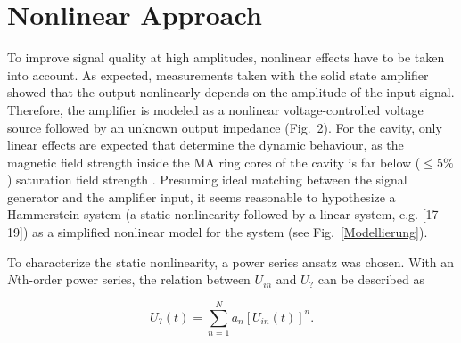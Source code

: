 \documentclass[a4paper,
              ]{jacow}
\begin{document}
	\section{Nonlinear Approach}			
	To improve signal quality at high amplitudes, nonlinear effects have to be taken into account. As expected, measurements taken with the solid state amplifier
	showed that the output nonlinearly depends on the amplitude of the input signal. Therefore, the amplifier is modeled as a nonlinear voltage-controlled
	voltage source followed by an unknown output impedance (Fig.~2). For the cavity, only linear effects
	are expected that determine the dynamic behaviour, as the magnetic field strength inside the MA ring cores of the cavity is far below ($\le 5\%$) 
	saturation field strength \cite{VV_JH}. Presuming ideal matching between the signal generator and the amplifier input, it seems reasonable to hypothesize a Hammerstein
	system (a static nonlinearity followed by a linear system, e.g. [17-19]) as a simplified nonlinear model for the system %
	(see Fig.~\ref{Modellierung}).
	
	To characterize the static nonlinearity, a power series ansatz was chosen. With an $N$th-order power series, the relation between $U_{in}$ and $U_?$
	can be described as
	
	\begin{equation}
	 U_?(t)=\sum_{n=1}^N a_n \left[ U_{in}(t) \right]^n.
	 \label{Potenzreihe}
	\end{equation}
	
\end{document}
